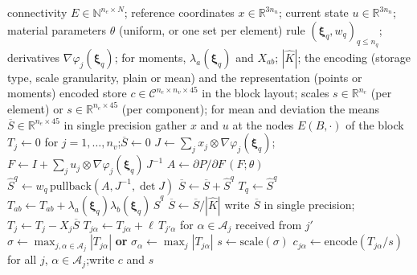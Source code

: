 \documentclass[sigconf,balance=false]{acmart}
\newcommand{\R}{\mathbb{R}}
\newcommand{\refcell}{\widehat{K}}
\newcommand{\xhat}{\boldsymbol{\xi}}
\newcommand{\Sq}{\widehat{S}^{q}}
\newcommand{\Sbar}{\overline{S}}
\begin{document}
\begin{algorithm*}[t]
\caption{Set-up: evaluate, reduce and encode the store (once per Newton step)}
\label{alg:setup}
\begin{algorithmic}[1]
\Require connectivity $E\in\mathbb{N}^{n_e\times N}$; reference coordinates $x\in\R^{3n_n}$;
  current state $u\in\R^{3n_n}$; material parameters $\theta$ (uniform, or one set per element)
\Constants rule $(\xhat_q,w_q)_{q\le n_q}$; derivatives $\nabla\varphi_j(\xhat_q)$; for moments,
  $\lambda_a(\xhat_q)$ and $X_{ab}$; $|\refcell|$; the encoding (storage type, scale granularity,
  plain or mean) and the representation (points or moments)
\Ensure encoded store $c\in\mathcal{C}^{n_e\times n_v\times45}$ in the block layout; scales
  $s\in\R^{n_e}$ (per element) or $s\in\R^{n_e\times45}$ (per component); for mean and deviation the
  means $\Sbar\in\R^{n_e\times45}$ in single precision
  \State gather $x$ and $u$ at the nodes $E(B,\cdot)$ of the block
  \State $T_j \gets 0$ for $j=1,\dots,n_v$;\quad $\Sbar \gets 0$
    \State $J \gets \sum_j x_j \otimes \nabla\varphi_j(\xhat_q)$;\quad
           $F \gets I + \sum_j u_j \otimes \nabla\varphi_j(\xhat_q)\, J^{-1}$
    \State $A \gets \partial P/\partial F\,(F;\theta)$ 
    \State $\Sq \gets w_q\,\mathrm{pullback}(A, J^{-1}, \det J)$ 
    \State $\Sbar \gets \Sbar + \Sq$
      \State $T_q \gets \Sq$
    \Else
        $T_{ab} \gets T_{ab} + \lambda_a(\xhat_q)\lambda_b(\xhat_q)\,\Sq$
      \EndFor
    \EndIf
  \EndFor
  \State $\Sbar \gets \Sbar/|\refcell|$
    \State write $\Sbar$ in single precision;\quad $T_j \gets T_j - X_j\Sbar$
  \EndIf
    \State $T_{j\alpha} \gets T_{j\alpha} + \ell\,T_{j'\alpha}$ for $\alpha\in\mathcal{A}_j$ received from
           $j'$ 
  \EndIf
  \State $\sigma \gets \max_{j,\alpha\in\mathcal{A}_j}|T_{j\alpha}|$ \textbf{or}
         $\sigma_\alpha \gets \max_j |T_{j\alpha}|$ 
  \State $s \gets \mathrm{scale}(\sigma)$ 
  \State $c_{j\alpha} \gets \mathrm{encode}(T_{j\alpha}/s)$ for all $j$, $\alpha\in\mathcal{A}_j$;\quad write $c$ and $s$
\EndFor
\end{algorithmic}
\end{algorithm*}
\end{document}
